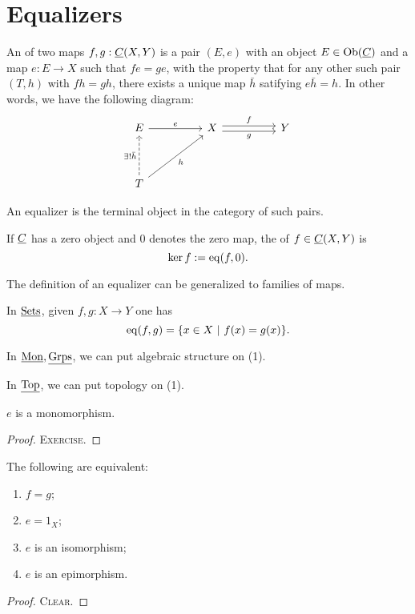 \section{Equalizers}

\begin{definition*}
	An  of two maps \( f, g: \underline{C}(X, Y) \) is a pair \( (E, e) \) with an object \( E \in \operatorname{Ob}(\underline{C}) \) and a map \( e: E \to X \) such that \( fe = ge \), with the property that for any other such pair \( (T, h) \) with \( fh = gh \), there exists a unique map \( \bar{h} \) satifying \( e \bar{h} = h \). In other words, we have the following diagram:
	\[
		\begin{tikzcd}
			E && X && Y \\
			\\
			T
			\arrow["e", from=1-1, to=1-3]
			\arrow["f", shift left, from=1-3, to=1-5]
			\arrow["g"', shift right, from=1-3, to=1-5]
			\arrow["{\exists! \bar{h}}", dashed, from=3-1, to=1-1]
			\arrow["h"', from=3-1, to=1-3]
		\end{tikzcd}
	\]
\end{definition*}

\begin{remarks*}
	\item An equalizer is the terminal object in the category of such pairs.
	\item If \( \underline{C} \) has a zero object and \( 0 \) denotes the zero map, the  of \( f \in \underline{C}(X, Y) \) is
		\[
			\ker f := \operatorname{eq}(f, 0).
		\]
	\item The definition of an equalizer can be generalized to families of maps.
\end{remarks*}

\begin{examples*}
	\item In \( \underline{\mathrm{Sets}} \), given \( f, g: X \to Y \) one has
		\[
			\operatorname{eq}(f, g) = \{x \in X ~|~ f(x) = g(x)\}.
		\]
	\item In \( \underline{\mathrm{Mon}}, \underline{\mathrm{Grps}} \), we can put algebraic structure on (1).
	\item In \( \underline{\mathrm{Top}} \), we can put topology on (1).
\end{examples*}

\begin{proposition*}
	\( e \) is a monomorphism.
\end{proposition*}
\begin{proof}
	\textsc{Exercise}.
\end{proof}

\begin{proposition*}
	The following are equivalent:
	\begin{enumerate}
		\item \( f = g \);
		\item \( e = 1_X \);
		\item \( e \) is an isomorphism;
		\item \( e \) is an epimorphism.
	\end{enumerate}
\end{proposition*}
\begin{proof}
	\textsc{Clear}.
\end{proof}